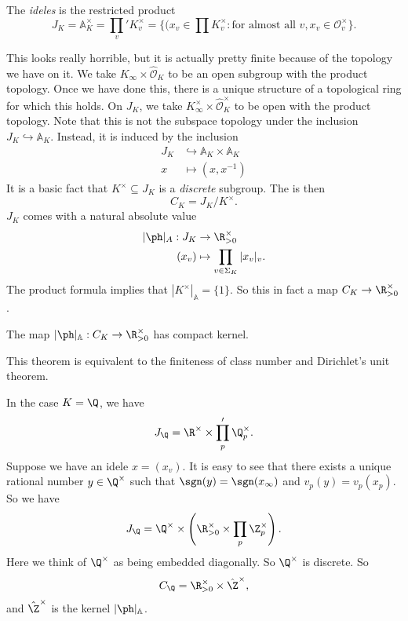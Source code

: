 \documentclass[a4paper]{article}
\newcommand\A{\mathbb{A}}
\begin{document}
\begin{defi}[Idele]
  The \emph{ideles} is the restricted product
  \[
    J_K = \A_K^\times = \prod_v' K_v^\times = \{(x_v \in \prod K_v^\times: \text{for almost all }v, x_v \in \mathcal{O}_v^\times\}.
  \]
\end{defi}
This looks really horrible, but it is actually pretty finite because of the topology we have on it. We take $K_\infty \times \hat{\mathcal{O}}_K$ to be an open subgroup with the product topology. Once we have done this, there is a unique structure of a topological ring for which this holds. On $J_K$, we take $K_\infty^\times \times \hat{\mathcal{O}}_K^\times$ to be open with the product topology. Note that this is not the subspace topology under the inclusion $J_K \hookrightarrow \A_K$. Instead, it is induced by the inclusion
\begin{align*}
  J_K &\hookrightarrow \A_K \times \A_K\\
  x &\mapsto (x, x^{-1})
\end{align*}
It is a basic fact that $K^\times \subseteq J_K$ is a \emph{discrete} subgroup. The  is then
\[
  C_K = J_K/K^\times.
\]
$J_K$ comes with a natural absolute value
\begin{align*}
  |\ph|_A: J_K &\to \R_{> 0}^\times\\
  (x_v) &\mapsto \prod_{v \in \Sigma_K} |x_v|_v.
\end{align*}
The product formula implies that $|K^\times|_{\A} = \{1\}$. So this in fact a map $C_K \to \R_{>0}^\times$.

\begin{thm}
  The map $|\ph|_\A: C_K \to \R_{>0}^\times$ has compact kernel.
\end{thm}
This theorem is equivalent to the finiteness of class number and Dirichlet's unit theorem.

\begin{eg}
  In the case $K = \Q$, we have
  \[
    J_{\Q} = \R^\times \times \prod'_p \Q_p^\times.
  \]
  Suppose we have an idele $x = (x_v)$. It is easy to see that there exists a unique rational number $y \in \Q^\times$ such that $\sgn(y) = \sgn(x_\infty)$ and $v_p(y) = v_p(x_p)$. So we have
  \[
    J_\Q = \Q^\times \times \left(\R^\times_{>0} \times \prod_p \Z_p^\times\right).
  \]
  Here we think of $\Q^\times$ as being embedded diagonally. So $\Q^\times$ is discrete. So
  \[
    C_\Q = \R_{>0}^\times \times \hat{\Z}^\times,
  \]
  and $\hat{\Z}^\times$ is the kernel $|\ph|_{\A}$.
\end{eg}
\end{document}
